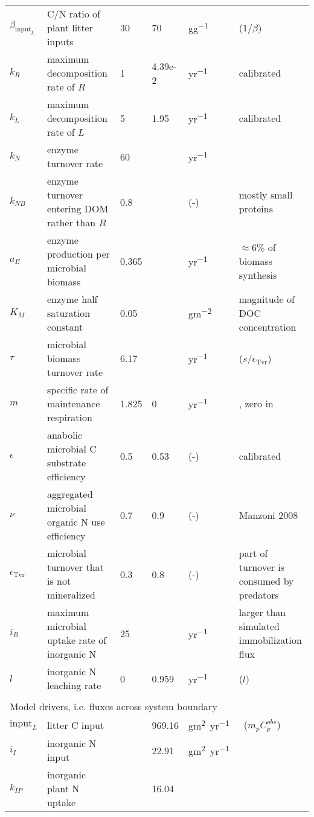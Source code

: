 \begin{table}[t]
\begin{tabular}{lp{6cm}lllp{5.5cm}}
$\beta_{\mathrm{input}_L}$ &  C/N ratio of plant litter inputs & 30 & 70 &
\unit{gg^{-1}} & \citep{Perveen14} ($1/\beta$) \\
$k_R$ &  maximum decomposition rate of $R$ & 1 & 4.39e-2 & \unit{yr^{-1}}
& calibrated \\
$k_L$ &  maximum decomposition rate of $L$ & 5 & 1.95 & \unit{yr^{-1}}
& calibrated \\
$k_N$ &  enzyme turnover rate &  60  & & \unit{yr^{-1}} & \citep{Burns13} \\
$k_{NB}$ & enzyme turnover entering DOM rather than $R$ & 
0.8 & & (-) & mostly small proteins \\
$a_{E}$ &  enzyme production per microbial biomass & 0.365 & &
\unit{yr^{-1}} & $\approx 6\%$ of biomass synthesis \\ 
$K_{M}$ &  enzyme half saturation constant & 0.05 & &
\unit{gm^{-2}} & magnitude of DOC concentration \\
$\tau$ &  microbial biomass turnover rate & 6.17 & & \unit{yr^{-1}} &
\citep{Perveen14} ($s/\epsilon_{\operatorname{Tvr}}$) \\
$m$ & specific rate of maintenance respiration & 1.825 & 0 & 
\unit{yr^{-1}} & \citep{Bodegom07}, zero in \citep{Perveen14} \\
$\epsilon$ & anabolic microbial C substrate efficiency & 0.5 & 0.53 &
(-) & calibrated \\ %
$\nu$ & aggregated microbial organic N use efficiency & 0.7 &
0.9 & (-) & Manzoni 2008 \\
$\epsilon_{\operatorname{Tvr}}$ & microbial turnover that is not
mineralized & 0.3 & 0.8 & (-) & part of turnover is consumed by
predators
\\
$i_{B}$ & maximum microbial uptake rate of inorganic N & 25 & & \unit{yr^{-1}} 
& larger than simulated immobilization flux \\
$l$ & inorganic N leaching rate & 0 & 0.959 &
\unit{yr^{-1}} & \citep{Perveen14} ($l)$ \\
\\
\multicolumn{6}{l}{Model drivers, i.e. fluxes across system boundary}  \\ 
$\mathrm{input}_{L}$ & litter C input & & 969.16 &
\unit{gm^2yr^{-1}} & \citep{Perveen14} \, ($m_p C^{obs}_p$)\\
$i_{I}$ & inorganic N input & & 22.91 & \unit{gm^2yr^{-1}} 
& \citep{Perveen14} \\
$k_{IP}$ & inorganic plant N uptake & & 16.04 & 

\end{tabular}
\end{table}
